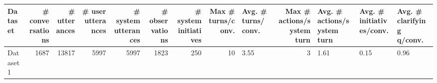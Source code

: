 \begin{tabular}{lrrrrrrrlrlll}
\toprule
Dataset & # conversations & # utterances & # user utterances & # system utterances & # observations & # system initiatives & Max # turns/conv. & Avg. # turns/conv. & Max # actions/system turn & Avg. # actions/system turn & Avg. # initiatives/conv. & Avg. # clarifying q/conv. \\
\midrule
Dataset1 & 1687 & 13817 & 5997 & 5997 & 1823 & 250 & 10 & 3.55 & 3 & 1.61 & 0.15 & 0.96 \\
\bottomrule
\end{tabular}
